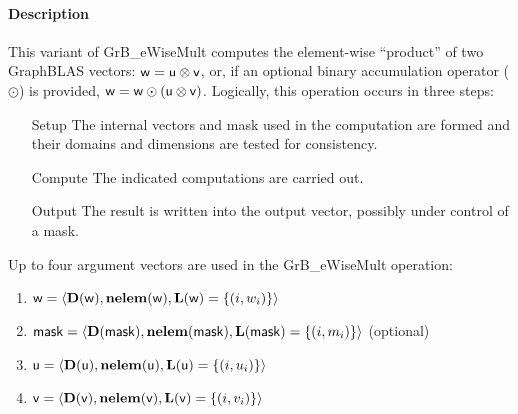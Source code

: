 \paragraph{Description}

This variant of {\sf GrB\_eWiseMult} computes the element-wise ``product'' of
two GraphBLAS vectors: ${\sf w} = {\sf u} \otimes {\sf v}$, or, if an optional
binary accumulation operator ($\odot$) is provided, ${\sf w} = {\sf w} \odot
\left({\sf u} \otimes {\sf v}\right)$.  Logically, this operation occurs in
three steps:
\begin{enumerate}[leftmargin=0.75in]
\item[Setup] The internal vectors and mask used in the computation are formed 
and their domains and dimensions are tested for consistency.
\item[Compute] The indicated computations are carried out.
\item[Output] The result is written into the output vector, possibly under 
control of a mask.
\end{enumerate}

Up to four argument vectors are used in the {\sf GrB\_eWiseMult} operation:
\begin{enumerate}
	\item ${\sf w} = \langle \bold{D}({\sf w}),\bold{nelem}({\sf w}),\bold{L}({\sf w}) = \{(i,w_i) \} \rangle$
	\item ${\sf mask} = \langle \bold{D}({\sf mask}),\bold{nelem}({\sf mask}),\bold{L}({\sf mask}) = \{(i,m_i) \} \rangle$ (optional)
	\item ${\sf u} = \langle \bold{D}({\sf u}),\bold{nelem}({\sf u}),\bold{L}({\sf u}) = \{(i,u_i) \} \rangle$
	\item ${\sf v} = \langle \bold{D}({\sf v}),\bold{nelem}({\sf v}),\bold{L}({\sf v}) = \{(i,v_i) \} \rangle$
\end{enumerate}

